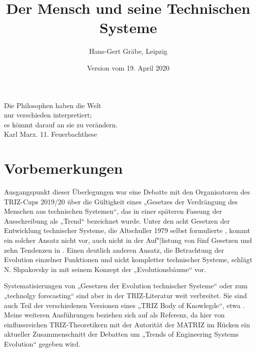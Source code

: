 \documentclass[11pt,a4paper]{article}
\title{Der Mensch und seine Technischen Systeme}
\author{Hans-Gert Gräbe, Leipzig}
\date{Version vom 19. April 2020}
\begin{document}
\maketitle

\begin{flushright}
  Die Philosophen haben die Welt\\ nur verschieden interpretiert;\\ es kömmt
  darauf an sie zu verändern.\\ Karl Marx. 11. Feuerbachthese
\end{flushright}
\section{Vorbemerkungen}

Ausgangspunkt dieser Überlegungen war eine Debatte mit den Organisatoren des
TRIZ-Cups 2019/20 über die Gültigkeit eines „Gesetzes der Verdrängung des
Menschen aus technischen Systemen“, das in einer späteren Fassung der
Ausschreibung als „Trend“ bezeichnet wurde. Unter den acht Gesetzen der
Entwicklung technischer Systeme, die Altschuller 1979 selbst formulierte
\cite[S. 2]{TESE2018}, kommt ein solcher Ansatz nicht vor, auch nicht in der
Auf"|listung von fünf Gesetzen und zehn Tendenzen in
\cite[S. 148\,ff.]{KoltzeSouchkov2017}. Einen deutlich anderen Ansatz, die
Betrachtung der Evolution einzelner Funktionen und nicht kompletter
technischer Systeme, schlägt N. Shpakovsky in \cite{Shpakovsky2010} mit seinem
Konzept der „Evolutionsbäume“ vor. 

Systematisierungen von „Gesetzen der Evolution technischer Systeme“ oder zum
„technolgy forecasting“ sind aber in der TRIZ-Literatur weit verbreitet. Sie
sind auch Teil der verschiedenen Versionen eines „TRIZ Body of Knowlegde“,
etwa \cite{TBK-2007}. Meine weiteren Ausführungen beziehen sich auf
\cite{TESE2018} als Referenz, da hier von einflussreichen TRIZ-Theoretikern
mit der Autorität der MATRIZ im Rücken ein aktueller Zusammenschnitt der
Debatten um „Trends of Engineering Systems Evolution“ gegeben wird.
\end{document}
